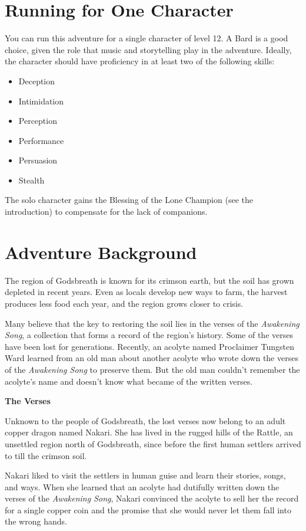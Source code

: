 \documentclass[letterpaper, 11pt, twocolumn]{dndbook}
\begin{document}
\section{Running for One Character}

You can run this adventure for a single character of level 12. A Bard is a good choice, given the role that music and storytelling play in the adventure. Ideally, the character should have proficiency in at least two of the following skills:

\begin{itemize}
\item Deception
\item Intimidation
\item Perception
\item Performance
\item Persuasion
\item Stealth
\end{itemize}

The solo character gains the Blessing of the Lone Champion (see the introduction) to compensate for the lack of companions.
\section{Adventure Background}

The region of Godsbreath is known for its crimson earth, but the soil has grown depleted in recent years. Even as locals develop new ways to farm, the harvest produces less food each year, and the region grows closer to crisis.

Many believe that the key to restoring the soil lies in the verses of the \textit{Awakening Song}, a collection that forms a record of the region's history. Some of the verses have been lost for generations. Recently, an acolyte named Proclaimer Tungsten Ward learned from an old man about another acolyte who wrote down the verses of the \textit{Awakening Song} to preserve them. But the old man couldn't remember the acolyte's name and doesn't know what became of the written verses.

\textbf{The Verses}

Unknown to the people of Godsbreath, the lost verses now belong to an adult copper dragon named Nakari. She has lived in the rugged hills of the Rattle, an unsettled region north of Godsbreath, since before the first human settlers arrived to till the crimson soil.

Nakari liked to visit the settlers in human guise and learn their stories, songs, and ways. When she learned that an acolyte had dutifully written down the verses of the \textit{Awakening Song}, Nakari convinced the acolyte to sell her the record for a single copper coin and the promise that she would never let them fall into the wrong hands.
\end{document}
